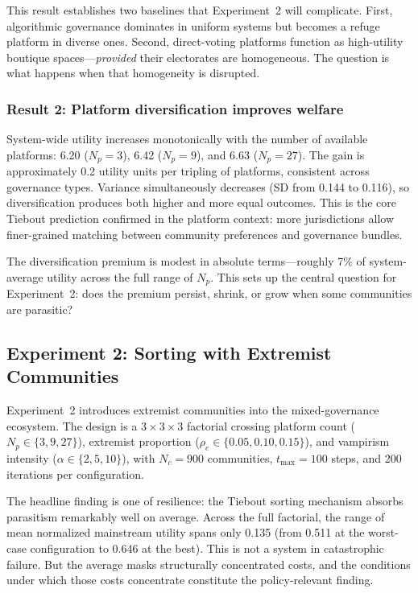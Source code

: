 This result establishes two baselines that Experiment~2 will complicate. First, algorithmic governance dominates in uniform systems but becomes a refuge platform in diverse ones. Second, direct-voting platforms function as high-utility boutique spaces---\textit{provided} their electorates are homogeneous. The question is what happens when that homogeneity is disrupted.

\subsubsection{Result 2: Platform diversification improves welfare}

System-wide utility increases monotonically with the number of available platforms: 6.20 ($N_p = 3$), 6.42 ($N_p = 9$), and 6.63 ($N_p = 27$). The gain is approximately 0.2 utility units per tripling of platforms, consistent across governance types. Variance simultaneously decreases (SD from 0.144 to 0.116), so diversification produces both higher and more equal outcomes. This is the core Tiebout prediction confirmed in the platform context: more jurisdictions allow finer-grained matching between community preferences and governance bundles.

The diversification premium is modest in absolute terms---roughly 7\% of system-average utility across the full range of $N_p$. This sets up the central question for Experiment~2: does the premium persist, shrink, or grow when some communities are parasitic?

\subsection{Experiment 2: Sorting with Extremist Communities}
\label{sec:results_exp2}

Experiment~2 introduces extremist communities into the mixed-governance ecosystem. The design is a $3 \times 3 \times 3$ factorial crossing platform count ($N_p \in \{3, 9, 27\}$), extremist proportion ($\rho_e \in \{0.05, 0.10, 0.15\}$), and vampirism intensity ($\alpha \in \{2, 5, 10\}$), with $N_c = 900$ communities, $t_{\max} = 100$ steps, and 200 iterations per configuration.

The headline finding is one of resilience: the Tiebout sorting mechanism absorbs parasitism remarkably well on average. Across the full factorial, the range of mean normalized mainstream utility spans only 0.135 (from 0.511 at the worst-case configuration to 0.646 at the best). This is not a system in catastrophic failure. But the average masks structurally concentrated costs, and the conditions under which those costs concentrate constitute the policy-relevant finding.

